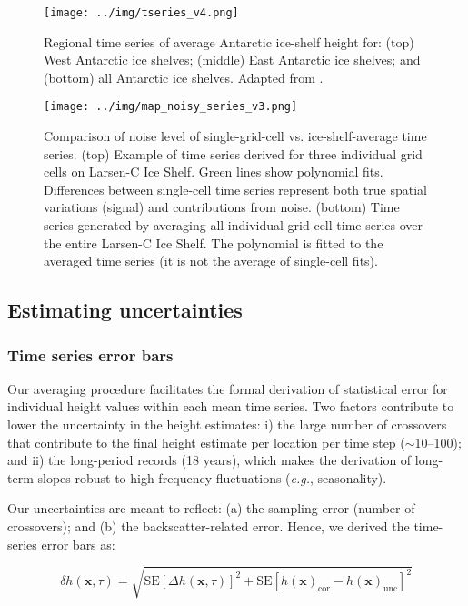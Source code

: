 \begin{figure}[!ht]
  \texttt{[image: ../img/tseries\_v4.png]}
  \caption{
  Regional time series of average Antarctic ice-shelf height for: (top) West Antarctic ice shelves; (middle) East Antarctic ice shelves; and (bottom) all Antarctic ice shelves. Adapted from \textcite{Paolo2015}.
  } 
  \label{c2f7}
\end{figure}


\begin{figure}[!ht]
  \texttt{[image: ../img/map\_noisy\_series\_v3.png]}
  \caption{
  Comparison of noise level of single-grid-cell vs. ice-shelf-average time series. (top) Example of time series derived for three individual grid cells on Larsen-C Ice Shelf. Green lines show polynomial fits. Differences between single-cell time series represent both true spatial variations (signal) and contributions from noise. (bottom) Time series generated by averaging all individual-grid-cell time series over the entire Larsen-C Ice Shelf. The polynomial is fitted to the averaged time series (it is not the average of single-cell fits).
  } 
  \label{c2f8}
\end{figure}


\subsection{Estimating uncertainties}

\subsubsection{Time series error bars}

Our averaging procedure facilitates the formal derivation of statistical error for individual height values within each mean time series. Two factors contribute to lower the uncertainty in the height estimates: i) the large number of crossovers that contribute to the final height estimate per location per time step ($\sim$10--100); and ii) the long-period records (18 years), which makes the derivation of long-term slopes robust to high-frequency fluctuations ({\it e.g.}, seasonality).

Our uncertainties are meant to reflect: (a) the sampling error (number of crossovers); and (b) the backscatter-related error. Hence, we derived the time-series error bars as:

\begin{equation}
  \delta h(\mathbf x,\tau) = \sqrt{
    \text{SE}[\Delta h(\mathbf x,\tau)]^2
    + \text{SE}[h(\mathbf x)_\text{cor} - h(\mathbf x)_\text{unc}]^2
    }
  \label{c2e7}
\end{equation}


